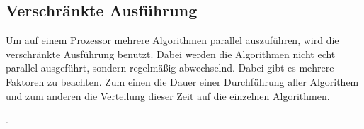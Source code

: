 \subsection{Verschränkte Ausführung}

Um auf einem Prozessor mehrere Algorithmen parallel auszuführen, wird die verschränkte Ausführung benutzt. Dabei werden die Algorithmen nicht echt parallel ausgeführt, sondern regelmäßig abwechselnd. Dabei gibt es mehrere Faktoren zu beachten. Zum einen die Dauer einer Durchführung aller Algorithem und zum anderen die Verteilung dieser Zeit auf die einzelnen Algorithmen.



 \cite{gaglioloschmidhuber06}.
